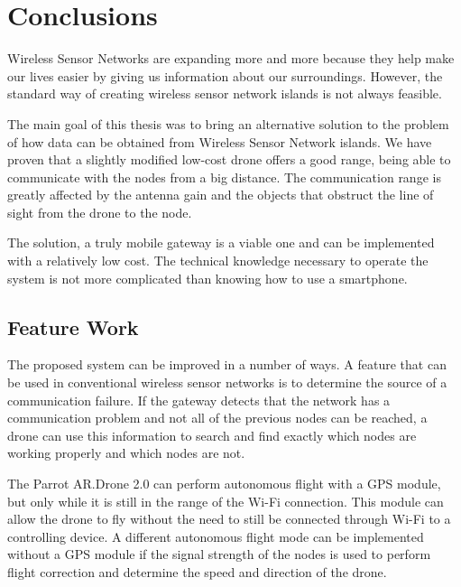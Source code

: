 \chapter{Conclusions}


Wireless Sensor Networks are expanding more and more because they help make our lives easier by giving us information about our surroundings. However, the standard way of creating wireless sensor network islands is not always feasible.

The main goal of this thesis was to bring an alternative solution to the problem of how data can be obtained from Wireless Sensor Network islands. We have proven that a slightly modified low-cost drone offers a good range, being able to communicate with the nodes from a big distance. The communication range is greatly affected by the antenna gain and the objects that obstruct the line of sight from the drone to the node.


The solution, a truly mobile gateway is a viable one and can be implemented with a relatively low cost. The technical knowledge necessary to operate the system is not more complicated than knowing how to use a smartphone.




\section{Feature Work}

The proposed system can be improved in a number of ways. A feature that can be used in conventional wireless sensor networks is to determine the source of a communication failure. If the gateway detects that the network has a communication problem and not all of the previous nodes can be reached, a drone can use this information to search and find exactly which nodes are working properly and which nodes are not.

The Parrot AR.Drone 2.0 can perform autonomous flight with a GPS module, but only while it is still in the range of the Wi-Fi connection. This module can allow the drone to fly without the need to still be connected through Wi-Fi to a controlling device. A different autonomous flight mode can be implemented without a GPS module if the signal strength of the nodes is used to perform flight correction and determine the speed and direction of the drone.


